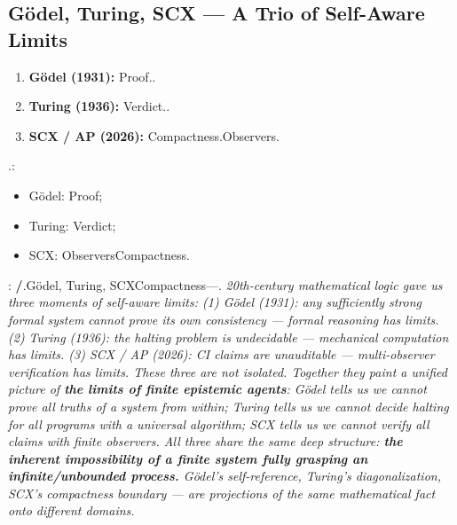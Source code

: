 \documentclass[12pt,a4paper]{article}
\theoremstyle{plain}
\theoremstyle{definition}
\theoremstyle{remark}
\begin{document}
\subsection{G\"odel, Turing, SCX --- A Trio of Self-Aware Limits}
\begin{enumerate}[label=(\arabic*)]
 \item \textbf{G\"odel (1931):} Proof..
 \item \textbf{Turing (1936):} Verdict..
 \item \textbf{SCX / AP (2026):} Compactness.Observers.
\end{enumerate}
.: 
\begin{itemize}
 \item G\"odel: Proof; 
 \item Turing: Verdict; 
 \item SCX: ObserversCompactness.
\end{itemize}
: \textbf{/}.G\"odel, Turing, SCXCompactness---.
\vspace{4pt}
\noindent
\textit{20th-century mathematical logic gave us three moments of self-aware limits: (1) G\"odel (1931): any sufficiently strong formal system cannot prove its own consistency --- formal reasoning has limits. (2) Turing (1936): the halting problem is undecidable --- mechanical computation has limits. (3) SCX / AP (2026): CI claims are unauditable --- multi-observer verification has limits. These three are not isolated. Together they paint a unified picture of \textbf{the limits of finite epistemic agents}: G\"odel tells us we cannot prove all truths of a system from within; Turing tells us we cannot decide halting for all programs with a universal algorithm; SCX tells us we cannot verify all claims with finite observers. All three share the same deep structure: \textbf{the inherent impossibility of a finite system fully grasping an infinite/unbounded process.} G\"odel's self-reference, Turing's diagonalization, SCX's compactness boundary --- are projections of the same mathematical fact onto different domains.}
\subsection{}
\end{document}

